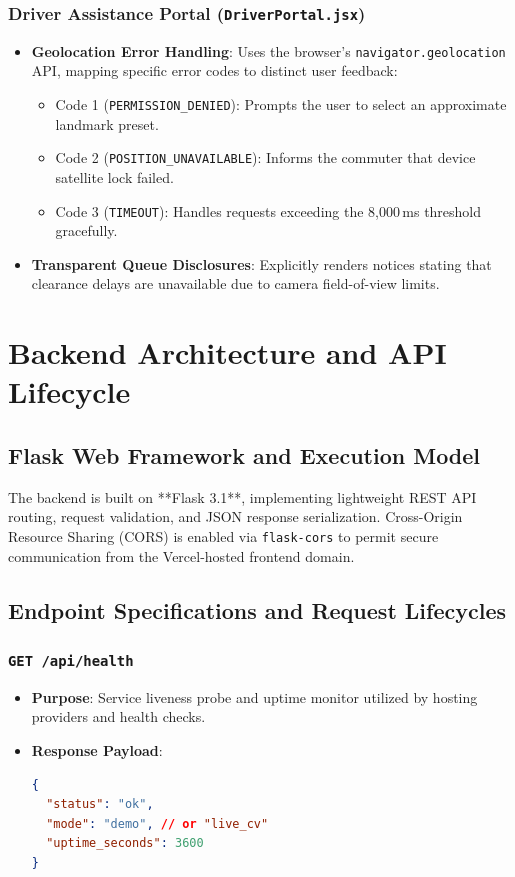 \documentclass[11pt,a4paper,oneside]{report}
\begin{document}
\subsection{Driver Assistance Portal (\texttt{DriverPortal.jsx})}
\begin{itemize}[leftmargin=*]
    \item \textbf{Geolocation Error Handling}: Uses the browser's \texttt{navigator.geolocation} API, mapping specific error codes to distinct user feedback:
    \begin{itemize}
        \item Code 1 (\texttt{PERMISSION\_DENIED}): Prompts the user to select an approximate landmark preset.
        \item Code 2 (\texttt{POSITION\_UNAVAILABLE}): Informs the commuter that device satellite lock failed.
        \item Code 3 (\texttt{TIMEOUT}): Handles requests exceeding the 8,000\,ms threshold gracefully.
    \end{itemize}
    \item \textbf{Transparent Queue Disclosures}: Explicitly renders notices stating that clearance delays are unavailable due to camera field-of-view limits.
\end{itemize}



\chapter{Backend Architecture and API Lifecycle}

\section{Flask Web Framework and Execution Model}
The backend is built on **Flask 3.1**, implementing lightweight REST API routing, request validation, and JSON response serialization. Cross-Origin Resource Sharing (CORS) is enabled via \texttt{flask-cors} to permit secure communication from the Vercel-hosted frontend domain.

\section{Endpoint Specifications and Request Lifecycles}

\subsection{\texttt{GET /api/health}}
\begin{itemize}[leftmargin=*]
    \item \textbf{Purpose}: Service liveness probe and uptime monitor utilized by hosting providers and health checks.
    \item \textbf{Response Payload}:
\begin{lstlisting}[language=json]
{
  "status": "ok",
  "mode": "demo", // or "live_cv"
  "uptime_seconds": 3600
}
\end{lstlisting}
\end{itemize}
\end{document}
